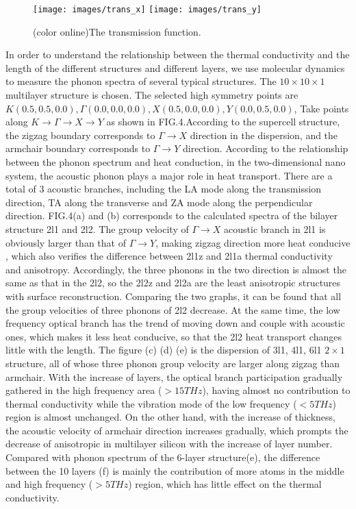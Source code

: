 \documentclass[%
 reprint,
 amsmath,amssymb,
 aps,
prb,
]{revtex4-1}
\begin{document}
\begin{figure}[b]
\texttt{[image: images/trans\_x]}
\texttt{[image: images/trans\_y]}
\caption{\label{fig:transmission} (color online)The transmission function.}
\end{figure}

In order to understand the relationship between the thermal conductivity and the length of the different structures and different layers, we use molecular dynamics to measure the phonon spectra of several typical structures. The $10 \times  10  \times  1$ multilayer structure is chosen. The selected high symmetry points are $K(0.5,0.5,0.0),\Gamma(0.0,0.0,0.0),X(0.5,0.0,0.0),  Y(0.0,0.5,0.0)$, Take points along $ K \rightarrow \Gamma \rightarrow X\rightarrow Y$ as shown in FIG.4.According to the supercell structure, the zigzag boundary corresponds to $ \Gamma \rightarrow X$ direction in the dispersion, and the armchair boundary corresponds to $\Gamma\rightarrow Y$ direction. According to the relationship between the phonon spectrum and heat conduction, in the two-dimensional nano system, the acoustic phonon plays a major role in heat transport. There are a total of 3 acoustic branches, including the LA mode along the transmission direction, TA along the transverse and ZA mode along the perpendicular direction. FIG.4(a) and (b) corresponds to the calculated spectra of the bilayer structure 2l1 and 2l2. The group velocity of $\Gamma\rightarrow X$ acoustic branch in 2l1 is obviously larger than that of $\Gamma\rightarrow Y$, making zigzag direction more heat conducive , which also verifies the difference between 2l1z and 2l1a thermal conductivity and anisotropy. Accordingly, the three phonons in the two direction is almost the same as that in the 2l2, so the 2l2z and 2l2a are the least anisotropic structures with surface reconstruction. Comparing the two graphs, it can be found that all the group velocities of three phonons of 2l2 decrease. At the same time, the low frequency optical branch has the trend of moving down and couple with acoustic ones, which makes it less heat conducive, so that the 2l2 heat transport changes little with the length. The figure (c) (d) (e) is the dispersion of 3l1, 4l1, 6l1 $2 \times 1$ structure, all of whose three phonon group velocity are larger along zigzag than armchair. With the increase of layers, the optical branch participation gradually gathered in the high frequency area ($>15THz$), having almost no contribution to thermal conductivity while the vibration mode of the low frequency ($<5THz$) region is almost unchanged. On the other hand, with the increase of thickness, the acoustic velocity of armchair direction increases gradually, which prompts the decrease of anisotropic in multilayer silicon with the increase of layer number. Compared with phonon spectrum of the 6-layer structure(e), the difference between the 10 layers (f) is mainly the contribution of more atoms in the middle and high frequency ($>5THz$) region, which has little effect on the thermal conductivity.
\end{document}
